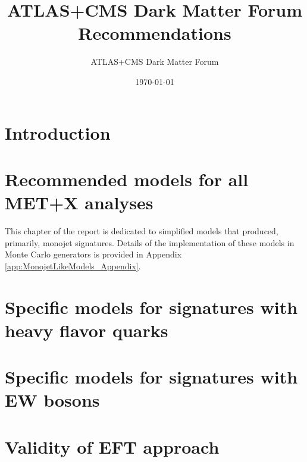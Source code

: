 \documentclass[a4paper,debug,notitlepage,nobib]{tufte-book}
\title{ATLAS+CMS Dark Matter Forum Recommendations}
\author{ATLAS+CMS Dark Matter Forum}
\date{\today}
\begin{document}
\morefloats
\setcounter{secnumdepth}{3} %



\tableofcontents

\pagebreak

\chapter{Introduction}
\label{sec:Introduction}


\chapter{Recommended models for all MET+X analyses}
This chapter of the report is dedicated to simplified
models that produced, primarily, monojet signatures.
Details of the implementation of these models in
Monte Carlo generators is provided in
Appendix \ref{app:MonojetLikeModels_Appendix}.
\label{subsec:MonojetLikeModels}


% 


\chapter{Specific models for signatures with heavy flavor quarks}
\label{subsec:DMHFModels}


\chapter{Specific models for signatures with EW bosons}
\label{subsec:EWSpecificModels}



%
\chapter{Validity of EFT approach}
\label{sec:EFTValidity} 

%
\end{document}
